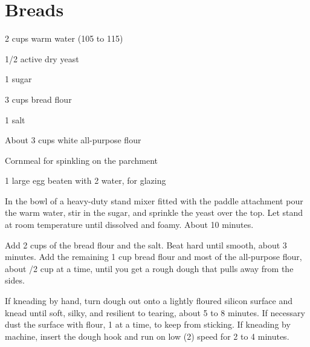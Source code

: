 \chapter{Breads}


%
%
%
%
\newpage



\begin{IngredientsAndSteps}
    \ListIngredientsAndSteps
    {
        2 cups warm water (105 to 115\Degrees[F])

        1/2 \Tbl[s] active dry yeast

        1 \Tbl sugar

        3 cups bread flour

        1 \Tbl salt

        About 3 cups white all-purpose flour

        Cornmeal for spinkling on the parchment

        1 large egg beaten with 2 \tsp[s] water, for glazing
    }
    {
        In the bowl of a heavy-duty stand mixer fitted with the paddle
        attachment pour the warm water, stir in the sugar, and sprinkle the
        yeast over the top. Let stand at room temperature until dissolved
        and foamy. About 10 minutes.

        Add 2 cups of the bread flour and the salt. Beat hard until smooth,
        about 3 minutes. Add the remaining 1 cup bread flour and most of the
        all-purpose flour, about /2 cup at a time, until you get a
        rough dough that pulls away from the sides.

        If kneading by hand, turn dough out onto a lightly floured silicon
        surface and knead until soft, silky, and resilient to tearing, about
        5 to 8 minutes. If necessary dust the surface with flour, 1 \Tbl
        at a time, to keep from sticking. If kneading by machine, insert the
        dough hook and run on low (2) speed for 2 to 4 minutes.

}
\end{IngredientsAndSteps}
